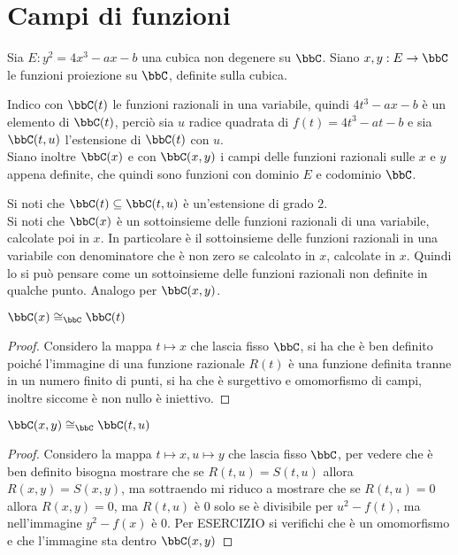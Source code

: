
\section{Campi di funzioni}

Sia $E: y^2=4x^3-ax-b$ una cubica non degenere su $\bbC$.
Siano $x,y:E\rightarrow\bbC$ le funzioni proiezione su $\bbC$, definite sulla cubica.
\begin{definizione}
Indico con $\bbC(t)$ le funzioni razionali in una variabile, quindi $4t^3-ax-b$ è un elemento di $\bbC(t)$, perciò sia $u$ radice quadrata di $f(t)=4t^3-at-b$ e sia $\bbC(t,u)$ l'estensione di $\bbC(t)$ con $u$.\\
Siano inoltre $\bbC(x)$ e con $\bbC(x,y)$ i campi delle funzioni razionali sulle $x$ e $y$ appena definite, che quindi sono funzioni con dominio $E$ e codominio $\bbC$.
\end{definizione}

\begin{osservazione}
Si noti che $\bbC(t)\subseteq\bbC(t,u)$ è un'estensione di grado $2$.\\
Si noti che $\bbC(x)$ è un sottoinsieme delle funzioni razionali di una variabile, calcolate poi in $x$. In particolare è il sottoinsieme delle funzioni razionali in una variabile con denominatore che è non zero se calcolato in $x$, calcolate in $x$. Quindi lo si può pensare come un sottoinsieme delle funzioni razionali non definite in qualche punto.
Analogo per $\bbC(x,y)$.
\end{osservazione}

\begin{proposizione}
$\bbC(x)\cong_{\bbC}\bbC(t)$
\end{proposizione}

\begin{proof}
Considero la mappa $t\mapsto x$ che lascia fisso $\bbC$, si ha che è ben definito poiché l'immagine di una funzione razionale $R(t)$ è una funzione definita tranne in un numero finito di punti, si ha che è surgettivo e omomorfismo di campi, inoltre siccome è non nullo è iniettivo.
\end{proof}

\begin{proposizione}
$\bbC(x,y)\cong_{\bbC}\bbC(t,u)$
\end{proposizione}

\begin{proof}
Considero la mappa $t\mapsto x, u\mapsto y$ che lascia fisso $\bbC$, per vedere che è ben definito bisogna mostrare che se $R(t,u)=S(t,u)$ allora $R(x,y)=S(x,y)$, ma sottraendo mi riduco a mostrare che se $R(t,u)=0$ allora $R(x,y)=0$, ma $R(t,u)$ è $0$ solo se è divisibile per $u^2-f(t)$, ma nell'immagine $y^2-f(x)$ è $0$. Per ESERCIZIO si verifichi che è un omomorfismo e che l'immagine sta dentro $\bbC(x,y)$
\end{proof}

